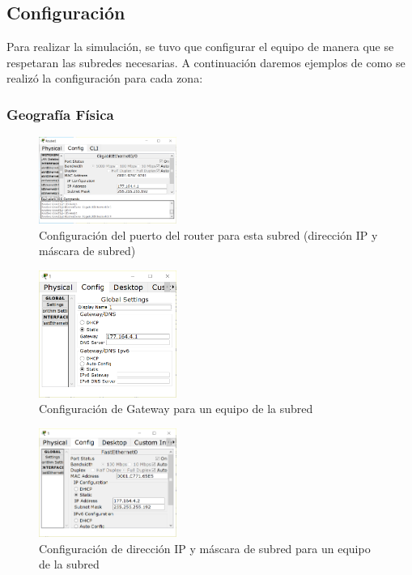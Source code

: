 \documentclass[../main.tex]{subfiles}
\begin{document}
\subsection*{Configuración}
Para realizar la simulación, se tuvo que configurar el equipo de manera que se respetaran las subredes necesarias. A continuación daremos ejemplos de como se realizó la configuración para cada zona:
\subsubsection*{Geografía Física}

\begin{figure}[H]
  \centering
  \includegraphics[width=0.4\textwidth]{images/1-port.PNG}
  \caption{Configuración del puerto del router para esta subred (dirección IP y máscara de subred)}\label{fig:ej11}
\end{figure}

\begin{figure}[H]
  \centering
  \includegraphics[width=0.4\textwidth]{images/1-g.PNG}
  \caption{Configuración de Gateway para un equipo de la subred}\label{fig:ej12}
\end{figure}

\begin{figure}[H]
  \centering
  \includegraphics[width=0.4\textwidth]{images/1-ip.PNG}
  \caption{Configuración de dirección IP y máscara de subred para un equipo de la subred}\label{fig:ej13}
\end{figure}
\end{document}
